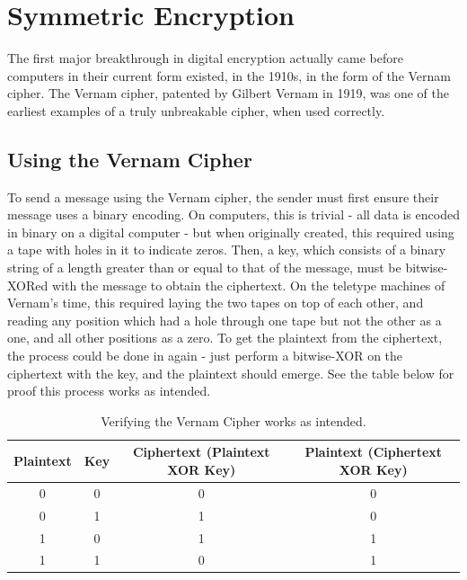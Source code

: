 \documentclass[a4paper,12pt]{report}
\begin{document}
  \section{Symmetric Encryption}
The first major breakthrough in digital encryption actually came before
computers in their current form existed, in the 1910s, in the form of the Vernam
cipher. The Vernam cipher, patented by Gilbert Vernam in 1919\cite{vernam}, was
one of the earliest examples of a truly unbreakable cipher, when used correctly.

    \subsection{Using the Vernam Cipher}
To send a message using the Vernam cipher, the sender must first ensure their
message uses a binary encoding. On computers, this is trivial - all data is
encoded in binary on a digital computer - but when originally created, this
required using a tape with holes in it to indicate zeros. Then, a key, which
consists of a binary string of a length greater than or equal to that of the
message, must be bitwise-XORed with the message to obtain the ciphertext. On the
teletype machines of Vernam's time, this required laying the two tapes on top of
each other, and reading any position which had a hole through one tape but not
the other as a one, and all other positions as a zero. To get the plaintext from
the ciphertext, the process could be done in again - just perform a
bitwise-XOR on the ciphertext with the key, and the plaintext should emerge. See
the table below for proof this process works as intended.
      \begin{center}
      \begin{table}[h!]
      \begin{tabular}{ |c|c|c|c| }
        \hline
Plaintext & Key & Ciphertext (Plaintext XOR Key) & Plaintext (Ciphertext XOR
Key) \\
        \hline
0 & 0 & 0 & 0 \\
        \hline
0 & 1 & 1 & 0 \\
        \hline
1 & 0 & 1 & 1 \\
        \hline
1 & 1 & 0 & 1 \\
        \hline
      \end{tabular}
      \caption{Verifying the Vernam Cipher works as intended.}
      \end{table}
      \end{center}
\end{document}
